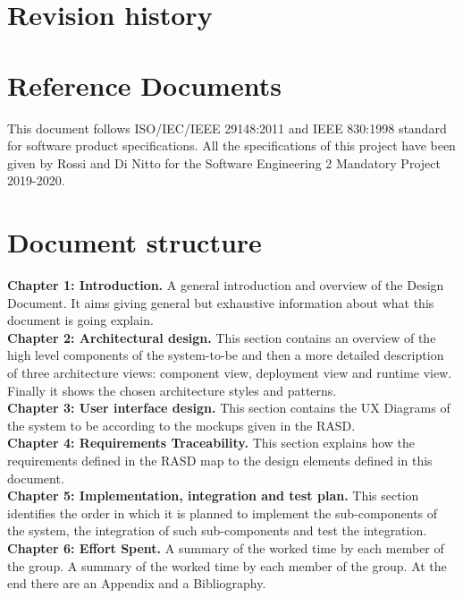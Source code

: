 \documentclass[../RASD.tex]{subfiles}
\begin{document}
    \section{Revision history}\label{sec:revision-history}
    \newpage
    \section{Reference Documents}\label{sec:reference-documents}
    This document follows ISO/IEC/IEEE 29148:2011 and IEEE 830:1998 standard for software product specifications.
    All the specifications of this project have been given by Rossi and Di Nitto for the Software Engineering 2 Mandatory Project 2019-2020.
    \newpage
    \section{Document structure}\label{sec:document-structure}
    \textbf{Chapter 1: Introduction.}
    A general introduction and overview of the Design Document.
    It aims giving general but exhaustive information about what this document is going explain.
    \\
    \textbf{Chapter 2: Architectural design.}
    This section contains an overview of the high level components of the system-to-be and then a more detailed description of three architecture views:
    component view, deployment view and runtime view.
    Finally it shows the chosen architecture styles and patterns.
    \\
    \textbf{Chapter 3: User interface design.}
    This section contains the UX Diagrams of the system to be according to the mockups given in the RASD.
    \\
    \textbf{Chapter 4: Requirements Traceability.}
    This section explains how the requirements defined in the RASD map to the design elements defined in this document.
    \\
    \textbf{Chapter 5: Implementation, integration and test plan.}
    This section identifies the order in which it is planned to implement the sub-components of the system,
    the integration of such sub-components and test the integration.
    \\
    \textbf{Chapter 6: Effort Spent.} A summary of the worked time by each member of the group.
    A summary of the worked time by each member of the group.
    At the end there are an Appendix and a Bibliography.
\end{document}
